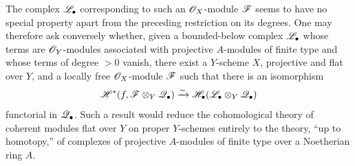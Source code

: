 The complex $\mathscr{L}_\bullet$ corresponding to such an
$\mathscr{O}_X$-module $\mathscr{F}$ seems to have no special property
apart from the preceding restriction on its degrees.  One may
therefore ask conversely whether, given a bounded-below complex
$\mathscr{L}_\bullet$ whose terms are $\mathscr{O}_Y$-modules associated
with projective $A$-modules of finite type and whose terms of
degree $>0$ vanish, there exist a $Y$-scheme $X$, projective and
flat over $Y$, and a locally free $\mathscr{O}_X$-module $\mathscr{F}$ such
that there is an isomorphism
\[
  \mathscr{H}^*
  (f,\mathscr{F}\otimes_Y\mathscr{Q}_\bullet)
  \xrightarrow{\sim}
  \mathscr{H}_\bullet
  (\mathscr{L}_\bullet\otimes_Y\mathscr{Q}_\bullet)
\]
functorial in $\mathscr{Q}_\bullet$.  Such a result would reduce the
cohomological theory of coherent modules flat over $Y$ on
proper $Y$-schemes entirely to the theory, ``up to homotopy,''
of complexes of projective $A$-modules of finite type over a
Noetherian ring $A$.
